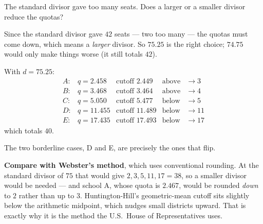 \documentclass[12pt]{ximera}
\begin{document}
\begin{problem}
\begin{prompt}
\begin{hint}
The standard divisor gave too many seats. Does a larger or a smaller divisor reduce
the quotas?
\end{hint}

\begin{feedback}
Since the standard divisor gave $42$ seats --- two too many --- the quotas must come
down, which means a \emph{larger} divisor. So $75.25$ is the right choice; $74.75$
would only make things worse (it still totals $42$).

With $d = 75.25$:
\[
\begin{array}{lllll}
A: & q = 2.458 & \text{cutoff } 2.449 & \text{above} & \to 3\\
B: & q = 3.468 & \text{cutoff } 3.464 & \text{above} & \to 4\\
C: & q = 5.050 & \text{cutoff } 5.477 & \text{below} & \to 5\\
D: & q = 11.455 & \text{cutoff } 11.489 & \text{below} & \to 11\\
E: & q = 17.435 & \text{cutoff } 17.493 & \text{below} & \to 17
\end{array}
\]
which totals $40$. \checkmark

The two borderline cases, D and E, are precisely the ones that flip.

\textbf{Compare with Webster's method}, which uses conventional rounding. At the
standard divisor of $75$ that would give $2, 3, 5, 11, 17 = 38$, so a smaller divisor
would be needed --- and school A, whose quota is $2.467$, would be rounded \emph{down}
to $2$ rather than up to $3$. Huntington-Hill's geometric-mean cutoff sits slightly
below the arithmetic midpoint, which nudges small districts upward. That is exactly why
it is the method the U.S.\ House of Representatives uses.
\end{feedback}
\end{prompt}
\end{problem}
\end{document}
